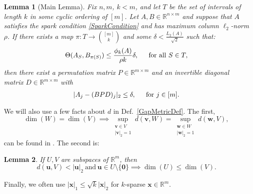 \documentclass[journal, twocolumn]{IEEEtran}
\newtheorem{lemma}{Lemma}
\begin{document}
\begin{lemma}[Main Lemma]\label{MainLemma}
Fix $n, m$, $k < m$, and let $T$ be the set of intervals of length $k$ in some cyclic ordering of $[m]$. Let $A, B \in \mathbb{R}^{n \times m}$ and suppose that $A$ satisfies the spark condition \eqref{SparkCondition} and has maximum column $\ell_2$-norm $\rho$.  If there exists a map $\pi: T \to {[m] \choose k}$ and some $\delta < \frac{L_{2}(A)}{\sqrt{2}}$ such that: 
\begin{equation}\label{GapUpperBound}
\Theta(A_{S}, B_{\pi(S)}) \leq \frac{ \phi_k(A) }{\rho k} \delta, \indent \text{for all } S \in T,
\end{equation}
%
then there exist a permutation matrix $P \in \mathbb{R}^{m \times m}$ and an invertible diagonal matrix $D \in \mathbb{R}^{m \times m}$ with
\begin{align}\label{MainLemmaBPD}
|A_j - (BPD)_j|_2 \leq \delta, \indent \text{for } j \in [m].
\end{align}
\end{lemma}

We will also use a few facts about $d$ in Def.~\ref{GapMetricDef}. The first, 
\begin{equation}\label{SubspaceMetricSameDim}
\dim(W) = \dim(V) \implies \sup_{\substack{\mathbf{v} \in V \\ |\mathbf{v}|_2 = 1}}  d(\mathbf{v},W)  = \sup_{\substack{\mathbf{w} \in W \\ |\mathbf{w}|_2 = 1}} d(\mathbf{w},V),
\end{equation}
can be found in \cite[Lem.~3.3]{Morris10}. The second is:
\begin{lemma}\label{MinDimLemma}
If $U, V$ are subspaces of $\mathbb{R}^{m}$, then
\begin{equation*}
d(\mathbf{u},V) < |\mathbf{u}|_2 \ \text{and} \  \mathbf{u} \in U \setminus{\{\mathbf{0}\}} \implies \dim(U) \leq \dim(V).
\end{equation*}
\end{lemma}
Finally, we often use $|\mathbf{x}|_1 \leq \sqrt{k} |\mathbf{x}|_2$ for $k$-sparse $\mathbf{x} \in \mathbb{R}^m$.
\end{document}
